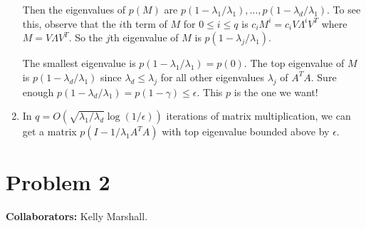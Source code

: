 \begin{enumerate}
    Then the eigenvalues of $p(M)$ are
    $p(1-\lambda_1/\lambda_1), \ldots, p(1-\lambda_d/\lambda_1)$.
    To see this, observe that the $i$th term of $M$ for
    $0\leq i \leq q$ is $c_i M^i = c_i V\Lambda^i V^T$ where
    $M = V \Lambda V^T$.
    So the $j$th eigenvalue of $M$ is
    $p(1-\lambda_j/\lambda_1)$.

    The smallest eigenvalue is $p(1-\lambda_1/\lambda_1)=p(0)$.
    The top eigenvalue of $M$ is $p(1-\lambda_d/\lambda_1)$
    since $\lambda_d \leq \lambda_j$ for all other eigenvalues
    $\lambda_j$ of $A^T A$.
    Sure enough $p(1-\lambda_d/\lambda_1) = p(1-\gamma) \leq \epsilon$.
    This $p$ is the one we want!

    \item 
    In $q=O(\sqrt{\lambda_1/\lambda_d}\log(1/\epsilon))$
    iterations of matrix multiplication, we can get a matrix
    $p(I-1/\lambda_1 A^T A)$ with top eigenvalue bounded above
    by $\epsilon$.
\end{enumerate}

\newpage
\section*{Problem 2}
\textbf{Collaborators:} Kelly Marshall.
\medskip

